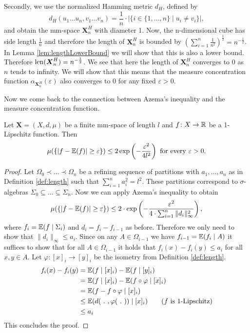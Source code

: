 \begin{example}
	Secondly, we use the normalized Hamming metric $d_H$, defined by 
	\[d_H(u_1\dots u_n,v_1\dots v_n)=\frac{1}{n}\cdot|\{i\in\{1,\dots,n\}\mid u_i\not=v_i\}|,\] and obtain the mm-space $\boldsymbol{X}^H_n$ with diameter 1. Now, the n-dimensional cube has side length $\frac{1}{n}$ and therefore the length of $\boldsymbol{X}^H_n$ is bounded by $(\sum_{i=1}^{n}\frac{1}{n^2})^{\frac{1}{2}}=n^{-\frac{1}{2}}$. In Lemma \ref{lem:lengthLowerBound} we will show that this is also a lower bound. Therefore $\operatorname{len}(\boldsymbol{X}^H_n)=n^{-\frac{1}{2}}$. We see that here the length of $\boldsymbol{X}^H_n$ converges to 0 as $n$ tends to infinity. We will show that this means that the measure concentration function $\alpha_{\boldsymbol{X}^H_n}(\varepsilon)$ also converges to 0 for any fixed $\varepsilon>0$. 
\end{example}
		
Now we come back to the connection between Azema's inequality and the measure concentration function.
		
\begin{lemma}\label{lem:lipschitz}
	Let $\boldsymbol{X}=(X,d,\mu)$ be a finite mm-space of length $l$ and $f\colon X\to\mathbb{R}$ be a 1-Lipschitz function. Then
	\[\mu(\{|f-\mathbb{E}(f)|\geq\varepsilon\})\leq 2\exp\left(-\frac{\varepsilon^2}{4l^2}\right)\text{ for every $\varepsilon>0$.}\] 
\end{lemma}
\begin{proof}
	Let 
	$\Omega_0\prec\dots\prec\Omega_n$
	be a refining sequence of partitions with $a_1,\dots,a_n$ as in Definition \ref{def:length} such that $\sum_{i=1}^{n}a_i^2=l^2$. These partitions correspond to $\sigma$-algebras $\Sigma_0\subseteq\dots\subseteq\Sigma_n$. Now we can apply Azema's inequality to obtain
	\[\mu(\{|f-\mathbb{E}(f)|\geq \varepsilon\})\leq 2\cdot\exp\left(-\frac{\varepsilon^2}{4\cdot\sum_{i=1}^{n}\|d_i\|^2_\infty}\right),\]
	where $f_i=\mathbb{E}(f\mid \Sigma_i)$ and $d_i=f_i-f_{i-1}$ as before. Therefore we only need to show that $\|d_i\|_\infty\leq a_i$. Since on any $A\in\Omega_{i-1}$ we have $f_{i-1}=\mathbb{E}(f_i\mid A)$ it suffices to show that for all $A\in\Omega_{i-1}$ it holds that $f_i(x)-f_i(y)\leq a_i$ for all $x,y\in A$.
	Let $\varphi\colon [x]_i\to [y]_i$ be the isometry from Definition \ref{def:length}.
	\begin{align*}
		f_i(x)-f_i(y) & =\mathbb{E}(f\mid [x]_i)-\mathbb{E}(f\mid [y]_i)                                   \\
		              & =\mathbb{E}(f\mid [x]_i)-\mathbb{E}(f\circ\varphi\mid [x]_i)                       \\
		              & =\mathbb{E}(f-f\circ\varphi\mid [x]_i)                                     \\
		              & \leq \mathbb{E}(d(\ .\ ,\varphi(\ .\ ))\mid [x]_i)\tag{$f$ is 1-Lipschitz} \\
		              & \leq a_i                                                        
	\end{align*}
	This concludes the proof.
\end{proof}
		

